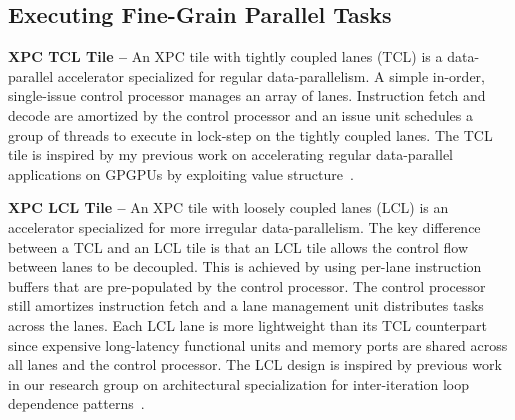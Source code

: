 
\subsection{Executing Fine-Grain Parallel Tasks}


\textbf{XPC TCL Tile --} An XPC tile with tightly coupled lanes (TCL) is
a data-parallel accelerator specialized for regular data-parallelism. A
simple in-order, single-issue control processor manages an array of
lanes. Instruction fetch and decode are amortized by the control
processor and an issue unit schedules a group of threads to execute in
lock-step on the tightly coupled lanes.
The TCL tile is inspired by my previous work on accelerating
regular data-parallel applications on GPGPUs by exploiting value
structure~\cite{kim-simt-vstruct-isca2013}.


\textbf{XPC LCL Tile --} An XPC tile with loosely coupled lanes (LCL) is
an accelerator specialized for more irregular data-parallelism.
The key difference between a TCL and an LCL tile is that an LCL tile
allows the control flow between lanes to be decoupled. This is achieved
by using per-lane instruction buffers that are pre-populated by the
control processor. The control processor still amortizes instruction
fetch and a lane management unit distributes tasks across the lanes. Each
LCL lane is more lightweight than its TCL counterpart since expensive
long-latency functional units and memory ports are shared across all
lanes and the control processor.
The LCL design is inspired by previous work in our research group on
architectural specialization for inter-iteration loop dependence
patterns~\cite{srinath-xloops-micro2014}.

